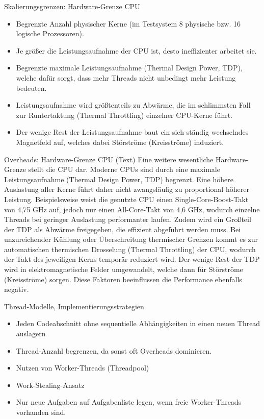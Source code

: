\documentclass[10pt, ngerman]{beamer}
\begin{document}
\begin{frame}{Skalierungsgrenzen: Hardware-Grenze CPU}
    \begin{itemize}
        \item Begrenzte Anzahl physischer Kerne (im Testsystem 8 physische bzw. 16 logische Prozessoren).
        \item Je größer die Leistungsaufnahme der CPU ist, desto ineffizienter arbeitet sie.
        \item Begrenzte maximale Leistungsaufnahme (Thermal Design Power, TDP), welche dafür sorgt, dass mehr Threads nicht unbedingt mehr Leistung bedeuten.
        \item Leistungsaufnahme wird größtenteils zu Abwärme, die im schlimmsten Fall zur Runtertaktung (Thermal Throttling) einzelner CPU-Kerne führt.
        \item Der wenige Rest der Leistungsaufnahme baut ein sich ständig wechselndes Magnetfeld auf, welches dabei Störströme (Kreisströme) induziert.
    \end{itemize}
\end{frame}

\begin{frame}{Overheads: Hardware-Grenze CPU (Text)}
    Eine weitere wesentliche Hardware-Grenze stellt die CPU dar. Moderne CPUs sind durch eine maximale Leistungsaufnahme (Thermal Design Power, TDP) begrenzt. Eine höhere Auslastung aller Kerne führt daher nicht zwangsläufig zu proportional höherer Leistung. Beispielsweise weist die genutzte CPU einen Single-Core-Boost-Takt von 4,75 GHz auf, jedoch nur einen All-Core-Takt von 4,6 GHz, wodurch einzelne Threads bei geringer Auslastung performanter laufen. Zudem wird ein Großteil der TDP als Abwärme freigegeben, die effizient abgeführt werden muss. Bei unzureichender Kühlung oder Überschreitung thermischer Grenzen kommt es zur automatischen thermischen Drosselung (Thermal Throttling) der CPU, wodurch der Takt des jeweiligen Kerns temporär reduziert wird.
    Der wenige Rest der TDP wird in elektromagnetische Felder umgewandelt, welche dann für Störströme (Kreisströme) sorgen.
    Diese Faktoren beeinflussen die Performance ebenfalls negativ.
\end{frame}

\begin{frame}{Thread-Modelle, Implementierungsstrategien}
    \begin{itemize}
        \item Jeden Codeabschnitt ohne sequentielle Abhängigkeiten in einen neuen Thread auslagern
        \item Thread-Anzahl begrenzen, da sonst oft Overheads dominieren.
        \item Nutzen von Worker-Threads (Threadpool)
        \item Work-Stealing-Ansatz
        \item Nur neue Aufgaben auf Aufgabenliste legen, wenn freie Worker-Threads vorhanden sind.
    \end{itemize}
\end{frame}
\end{document}
